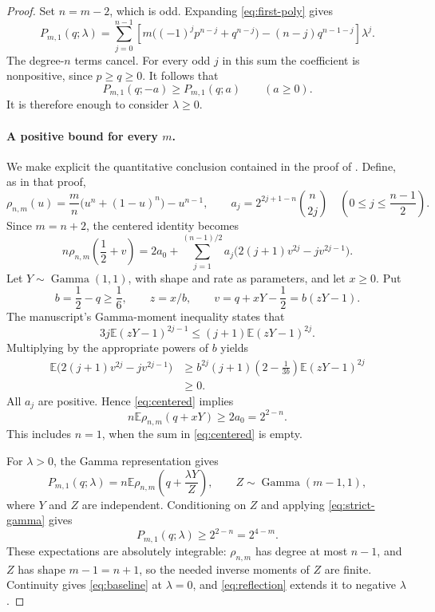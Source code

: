 \documentclass[11pt]{article}
\theoremstyle{remark}
\newcommand{\E}{\mathbb{E}}
\begin{document}
\begin{proof}
Set $n=m-2$, which is odd. Expanding \eqref{eq:first-poly} gives
\begin{equation}\label{eq:poly-expansion}
 P_{m,1}(q;\lambda)
 =\sum_{j=0}^{n-1}
 \left[m\bigl((-1)^jp^{n-j}+q^{n-j}\bigr)
       -(n-j)q^{n-1-j}\right]\lambda^j.
\end{equation}
The degree-$n$ terms cancel. For every odd $j$ in this sum the
coefficient is nonpositive, since $p\geq q\geq0$.
It follows that
\begin{equation}\label{eq:reflection}
 P_{m,1}(q;-a)\geq P_{m,1}(q;a)\qquad(a\geq0).
\end{equation}
It is therefore enough to consider $\lambda\geq0$.

\paragraph{A positive bound for every $m$.}
We make explicit the quantitative conclusion contained in the proof of
\cite[Proposition~5.6]{dense}. Define, as in that proof,
\[
 \rho_{n,m}(u)=\frac{m}{n}\bigl(u^n+(1-u)^n\bigr)-u^{n-1},
 \qquad
 a_j=2^{2j+1-n}\binom{n}{2j}
 \quad\left(0\leq j\leq\frac{n-1}{2}\right).
\]
Since $m=n+2$, the centered identity \cite[Eq.~(5.18)]{dense} becomes
\begin{equation}\label{eq:centered}
 n\rho_{n,m}\left(\frac12+v\right)
 =2a_0+\sum_{j=1}^{(n-1)/2}
 a_j\bigl(2(j+1)v^{2j}-jv^{2j-1}\bigr).
\end{equation}
Let $Y\sim\operatorname{Gamma}(1,1)$, with shape and rate as parameters,
and let $x\geq0$. Put
\[
 b=\frac12-q\geq\frac16,\qquad z=x/b,
 \qquad v=q+xY-\frac12=b(zY-1).
\]
The manuscript's Gamma-moment inequality
\cite[Lemma~5.5, with $r=1$]{dense} states that
\[
 3j\E(zY-1)^{2j-1}\leq(j+1)\E(zY-1)^{2j}.
\]
Multiplying by the appropriate powers of $b$ yields
\begin{align*}
 \E\bigl(2(j+1)v^{2j}-jv^{2j-1}\bigr)
 &\geq b^{2j}(j+1)
       \left(2-\frac{1}{3b}\right)\E(zY-1)^{2j}\\
 &\geq0.
\end{align*}
All $a_j$ are positive. Hence \eqref{eq:centered} implies
\begin{equation}\label{eq:strict-gamma}
 n\E\rho_{n,m}(q+xY)\geq2a_0=2^{2-n}.
\end{equation}
This includes $n=1$, when the sum in \eqref{eq:centered} is empty.

For $\lambda>0$, the Gamma representation
\cite[Eq.~(5.15), with $r=1$]{dense} gives
\[
 P_{m,1}(q;\lambda)
 =n\E\rho_{n,m}\left(q+\frac{\lambda Y}{Z}\right),
 \qquad Z\sim\operatorname{Gamma}(m-1,1),
\]
where $Y$ and $Z$ are independent. Conditioning on $Z$ and applying
\eqref{eq:strict-gamma} gives
\begin{equation}\label{eq:baseline}
 P_{m,1}(q;\lambda)\geq2^{2-n}=2^{4-m}.
\end{equation}
These expectations are absolutely integrable: $\rho_{n,m}$ has degree
at most $n-1$, and $Z$ has shape $m-1=n+1$, so the needed inverse
moments of $Z$ are finite. Continuity gives \eqref{eq:baseline} at
$\lambda=0$, and \eqref{eq:reflection} extends it to negative $\lambda$.


\end{proof}
\end{document}

